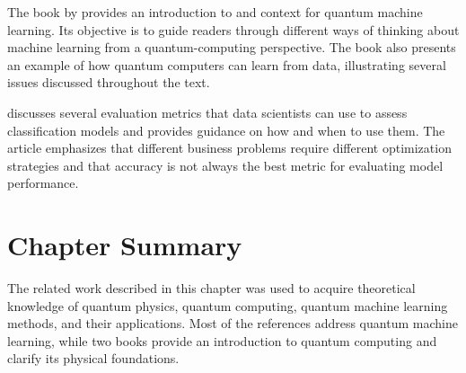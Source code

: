 The book by  provides an introduction to and context for quantum machine learning. Its objective is to guide readers through different ways of thinking about machine learning from a quantum-computing perspective. The book also presents an example of how quantum computers can learn from data, illustrating several issues discussed throughout the text.

 discusses several evaluation metrics that data scientists can use to assess classification models and provides guidance on how and when to use them. The article emphasizes that different business problems require different optimization strategies and that accuracy is not always the best metric for evaluating model performance.

\section{Chapter Summary}

The related work described in this chapter was used to acquire theoretical knowledge of quantum physics, quantum computing, quantum machine learning methods, and their applications. Most of the references address quantum machine learning, while two books provide an introduction to quantum computing and clarify its physical foundations.